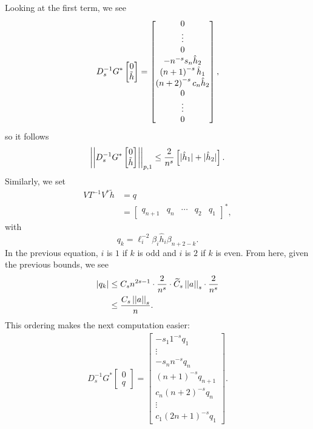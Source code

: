 Looking at the first term, we see
%
\begin{equation}
    D_{s}^{-1}G^{*}\begin{bmatrix} 0 \\ \tilde{h} \end{bmatrix}
    = \begin{bmatrix} 0 \\ \vdots \\ 0 \\ -n^{-s}s_{n}\hat{h}_{2} \\ 
        \left( n+1 \right)^{-s}\hat{h}_{1} \\ \left( n+2 \right)^{-s}c_{n}\hat{h}_{2} \\
        0 \\ \vdots \\ 0 \end{bmatrix},
\end{equation}
%
so it follows
%
\begin{equation}
    \left| \left| D_{s}^{-1}G^{*}\begin{bmatrix} 0 \\ \tilde{h} \end{bmatrix} \right| \right|_{p,1}
        \le \frac{2}{n^{s}}\left[  |\hat{h}_{1}| + |\hat{h}_{2}| \right].
\end{equation}
%
Similarly, we set
%
\begin{align}
    VT^{-1}V^{*}\tilde{h} &= q \nonumber\\
        &= \begin{bmatrix} q_{n+1} & q_{n} & \cdots & q_{2} & q_{1}
            \end{bmatrix}^{*},
\end{align}
%
with
%
\begin{equation}
    q_{k} = \ell_{i}^{-2}\beta_{i}\hat{h}_{i}\beta_{n+2-k}.
\end{equation}
%
In the previous equation, $i$ is $1$ if $k$ is odd
and $i$ is $2$ if $k$ is even.
From here, given the previous bounds, we see
%
\begin{align}
    \left| q_{k} \right| &\le C_{s}n^{2s-1}\cdot \frac{2}{n^{s}}
        \cdot \widetilde{C}_{s}\left| \left| a \right| \right|_{s}
            \cdot \frac{2}{n^{s}} \nonumber\\
    &\le \frac{C_{s}\left| \left| a \right| \right|_{s}}{n}.
    \label{eq:cvip_interp_1D_bdy_qk_bound}
\end{align}
%
This ordering makes the next computation easier:
%
\begin{align}
    D_{s}^{-1}G^{*} \begin{bmatrix} 0 \\ q \end{bmatrix}
        = \begin{bmatrix} -s_{1}1^{-s}q_{1} \\ \vdots \\ -s_{n}n^{-s}q_{n} \\
        (n+1)^{-s}q_{n+1} \\ c_{n}(n+2)^{-s}q_{n} \\ \vdots \\
        c_{1}(2n+1)^{-s}q_{1} \end{bmatrix}.
\end{align}
